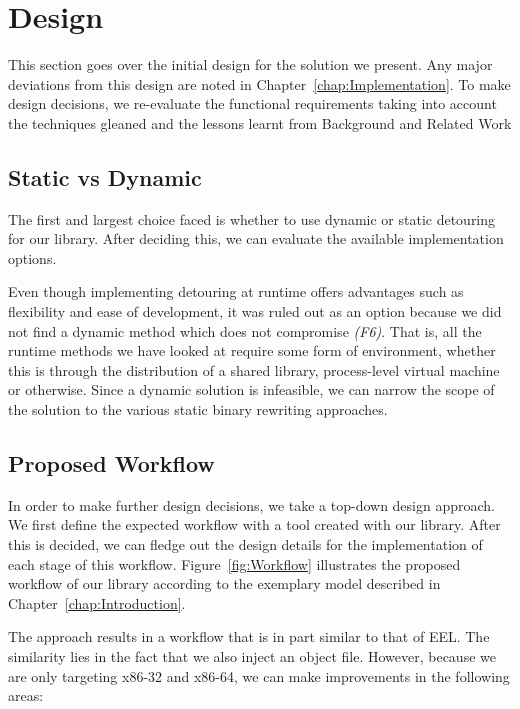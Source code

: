 \chapter{Design}\label{chap:Design}

This section goes over the initial design for the solution we present. Any major deviations from this design are noted in Chapter~\ref{chap:Implementation}. To make design decisions, we re-evaluate the functional requirements taking into account the techniques gleaned and the lessons learnt from Background and Related Work

\section{Static vs Dynamic}

The first and largest choice faced is whether to use dynamic or static detouring for our library. After deciding this, we can evaluate the available implementation options.

Even though implementing detouring at runtime offers advantages such as flexibility and ease of development, it was ruled out as an option because we did not find a dynamic method which does not compromise \emph{(F6)}. That is, all the runtime methods we have looked at require some form of environment, whether this is through the distribution of a shared library, process-level virtual machine or otherwise. Since a dynamic solution is infeasible, we can narrow the scope of the solution to the various static binary rewriting approaches.

\section{Proposed Workflow}

In order to make further design decisions, we take a top-down design approach. We first define the expected workflow with a tool created with our library. After this is decided, we can fledge out the design details for the implementation of each stage of this workflow. Figure~\ref{fig:Workflow} illustrates the proposed workflow of our library according to the exemplary model described in Chapter~\ref{chap:Introduction}.

The approach results in a workflow that is in part similar to that of EEL. The similarity lies in the fact that we also inject an object file. However, because we are only targeting x86-32 and x86-64, we can make improvements in the following areas:

